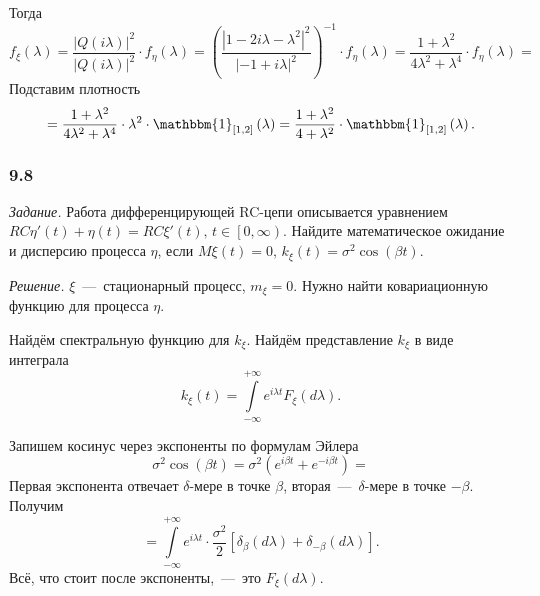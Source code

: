 Тогда
\begin{equation*}
  f_{ \xi } \left( \lambda \right) =
  \frac{ \left| Q \left( i \lambda \right) \right|^2}{ \left| Q \left( i \lambda \right) \right|^2} \cdot
  f_{ \eta } \left( \lambda \right) =
  \left( \frac{ \left| 1 - 2i \lambda - \lambda^2 \right|^2}{ \left| -1 + i \lambda \right|^2} \right)^{-1} \cdot
  f_{ \eta } \left( \lambda \right) =
  \frac{1 + \lambda^2}{4 \lambda^2 + \lambda^4} \cdot f_{ \eta } \left( \lambda \right) =
\end{equation*}
Подставим плотность
\begin{equation*}
  = \frac{1 + \lambda^2}{4 \lambda^2 + \lambda^4} \cdot \lambda^2 \cdot
  \mathbbm{1}_{ \left[ 1, 2 \right] } \left( \lambda \right) =
  \frac{1 + \lambda^2}{4 + \lambda^2} \cdot
  \mathbbm{1}_{ \left[ 1, 2 \right] } \left( \lambda \right).
\end{equation*}

\subsubsection*{9.8}

\textit{Задание.}
Работа дифференцирующей RC-цепи описывается уравнением
$RC \eta' \left( t \right) + \eta \left( t \right) =
  RC \xi' \left( t \right), \,
  t \in \left[ 0, \infty \right) $.
Найдите математическое ожидание и дисперсию процесса $ \eta $, если
$M \xi \left( t \right) = 0, \,
  k_{ \xi } \left( t \right) = \sigma^2 \cos \left( \beta t \right) $.

\textit{Решение.}
$ \xi $~---~стационарный процесс, $m_{ \xi } = 0$.
Нужно найти ковариационную функцию для процесса $ \eta $.

Найдём спектральную функцию для $k_{ \xi }$.
Найдём представление $k_{ \xi }$ в виде интеграла
\begin{equation*}
  k_{ \xi } \left( t \right) =
  \int \limits_{-\infty }^{+\infty }
    e^{i \lambda t} F_{ \xi } \left( d \lambda \right).
\end{equation*}

Запишем косинус через экспоненты по формулам Эйлера
\begin{equation*}
  \sigma^2 \cos \left( \beta t \right) =
  \sigma^2 \left( e^{i \beta t} + e^{-i \beta t} \right) =
\end{equation*}
Первая экспонента отвечает $ \delta $-мере в точке $ \beta $,
вторая~---~$ \delta $-мере в точке $-\beta $.
Получим
\begin{equation*}
  = \int \limits_{-\infty }^{+\infty }
    e^{i \lambda t} \cdot \frac{ \sigma^2}{2} \left[
      \delta_{ \beta } \left( d \lambda \right) +
      \delta_{-\beta } \left( d \lambda \right)
    \right].
\end{equation*}
Всё, что стоит после экспоненты,~---~это $F_{ \xi } \left( d \lambda \right) $.

